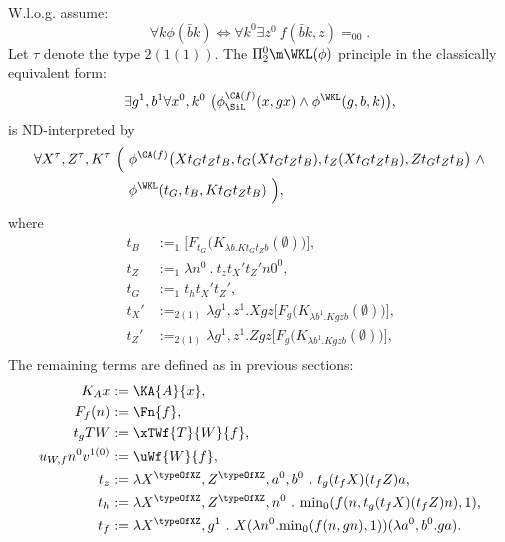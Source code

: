 \begin{prop} \label{p:ND-PI02WKL}
$ $
\\
W.l.o.g. assume:
\[
\forall k\phi(\bar bk) \Leftrightarrow \forall k^0\exists z^0\ f(\bar bk,z)=_00
\text{.}
\]
Let $\tau$ denote the type $2(1(1))$. The $\Pi^0_2\m\WKL(\phi)$ principle in the classically equivalent form:
\[
\exists g^1,b^1\forall x^0,k^0\ \big( \phi^{\CA(f)}_{\SiL}(x,gx)\wedge \phi^{\WKL}(g,b,k) \big)
\text{,}
\]
is ND-interpreted by
\begin{align*}
\forall X^\tau,Z^\tau,K^\tau\ \Big(\ &\phi^{\CA(f)}\big(
 Xt_{G}t_{Z}t_{B},
 t_{G}( Xt_{G}t_{Z}t_{B} ),
 t_{Z}( Xt_{G}t_{Z}t_{B} ),
 Zt_Gt_Zt_{B}\big)\ \wedge\\
 &\phi^{\WKL}(t_{G},t_{B},Kt_{G}t_{Z}t_{B})\ \Big) \text{,}
\end{align*}
where
\begin{align*}
        t_B    &:=_1 \big[F_{t_G}\big(K_{\lambda b.Kt_Gt_Zb}(\emptyset)\big)\big]\text{,}\\
        t_Z    &:=_1 \lambda n^0\ .\ t_zt_{X}'t_{Z}'n0^0\text{,}\\
        t_G    &:=_1 t_ht_{X}'t_{Z}'\text{,}\\
        t_{X}' &:=_{2(1)}\lambda g^1,z^{1} . Xgz 
                 \big[F_{g}\big(K_{\lambda b^1.Kgzb}(\emptyset)\big)\big] \text{,}\\
        t_{Z}' &:=_{2(1)}\lambda g^1,z^{1} . Zgz 
                 \big[F_{g}\big(K_{\lambda b^1.Kgzb}(\emptyset)\big)\big] \text{,}\\
\end{align*}
The remaining terms are defined as in previous sections:
\begin{align*}
        K_Ax     &:= \KA{A}{x}     \text{,}   \\
        F_{f}(n) &:= \Fn{f}    \text{,}\\
        t_gTW    &:= \xTWf{T}{W}{f}\text{,}   \\
        u_{W,f}n^0v^{1(0)}  
                 &:= \uWf{W}{f}    \text{,}\\
        t_z      &:=\lambda X^{\typeOfXZ},Z^{\typeOfXZ},a^0,b^0\ .\ t_g(t_fX)(t_fZ)a\text{,}\\
        t_h      &:=\lambda X^{\typeOfXZ},Z^{\typeOfXZ},n^0\ .\ 
                        {\min}_0(f(n,t_g(t_fX)(t_fZ)n),1) \text{,}\\
        t_f      &:=\lambda X^{\typeOfXZ},g^1\ .\ 
                       X(\lambda n^0 . {\min}_0(f(n,gn),1) )(\lambda a^0,b^0 . ga) 
\text{.}
\end{align*}
\end{prop}

